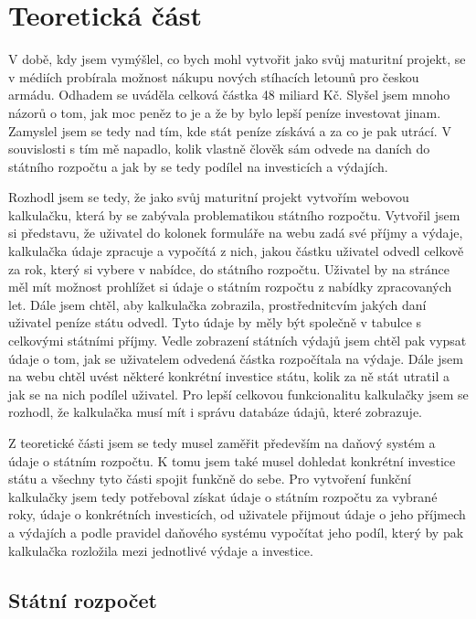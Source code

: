 \documentclass[11pt,a4paper,twoside,openright]{report}
\begin{document}


\setcounter{tocdepth}{2}
\tableofcontents

\chapter{Teoretická část}
\pagestyle{fancy}

V době, kdy jsem vymýšlel, co bych mohl vytvořit jako svůj maturitní projekt,
se v médiích probírala možnost nákupu nových stíhacích letounů pro českou armádu.
Odhadem se uváděla celková částka 48 miliard Kč. Slyšel jsem mnoho názorů o tom,
jak moc peněz to je a že by bylo lepší peníze investovat jinam. Zamyslel jsem se
tedy nad tím, kde stát peníze získává a za co je pak utrácí. V souvislosti s tím mě napadlo,
kolik vlastně člověk sám odvede na daních do státního rozpočtu a jak by se tedy
podílel na investicích a výdajích. 

Rozhodl jsem se tedy, že jako svůj maturitní projekt vytvořím webovou kalkulačku,
která by se zabývala problematikou státního rozpočtu. Vytvořil jsem si představu,
že uživatel do kolonek formuláře na webu zadá své příjmy a výdaje, kalkulačka údaje
zpracuje a vypočítá z nich, jakou částku uživatel odvedl celkově za rok, který si
vybere v nabídce, do státního rozpočtu. Uživatel by na stránce měl mít možnost prohlížet
si údaje o státním rozpočtu z nabídky zpracovaných let. Dále jsem chtěl, aby kalkulačka
zobrazila, prostřednitcvím jakých daní uživatel peníze státu odvedl. Tyto údaje by měly být
společně v tabulce s celkovými státními příjmy. Vedle zobrazení státních výdajů
jsem chtěl pak vypsat údaje o tom, jak se uživatelem odvedená částka rozpočítala na výdaje.
Dále jsem na webu chtěl uvést některé konkrétní investice státu, kolik za ně stát utratil
a jak se na nich podílel uživatel. Pro lepší celkovou funkcionalitu kalkulačky jsem se
rozhodl, že kalkulačka musí mít i správu databáze údajů, které zobrazuje.

Z teoretické části jsem se tedy musel zaměřit především na daňový systém a údaje o státním rozpočtu.
K tomu jsem také musel dohledat konkrétní investice státu a všechny tyto části spojit
funkčně do sebe. Pro vytvoření funkční kalkulačky jsem tedy potřeboval získat údaje o státním
rozpočtu za vybrané roky, údaje o konkrétních investicích, od uživatele přijmout údaje
o jeho příjmech a výdajích a podle pravidel daňového systému vypočítat jeho podíl, který by pak
kalkulačka rozložila mezi jednotlivé výdaje a investice.

\section{Státní rozpočet}
\end{document}
